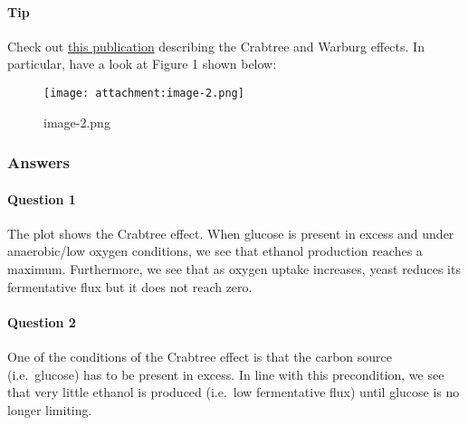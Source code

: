 \documentclass[11pt]{article}
\begin{document}
\hypertarget{tip}{%
\paragraph{Tip}\label{tip}}

Check out
\href{https://www.tandfonline.com/doi/full/10.1080/15384101.2018.1442622}{this
publication} describing the Crabtree and Warburg effects. In particular,
have a look at Figure 1 shown below:

\begin{figure}
\centering
\texttt{[image: attachment:image-2.png]}
\caption{image-2.png}
\end{figure}

\hypertarget{answers}{%
\subsubsection{Answers}\label{answers}}

\hypertarget{question-1}{%
\paragraph{Question 1}\label{question-1}}

The plot shows the Crabtree effect. When glucose is present in excess
and under anaerobic/low oxygen conditions, we see that ethanol
production reaches a maximum. Furthermore, we see that as oxygen uptake
increases, yeast reduces its fermentative flux but it does not reach
zero.

\hypertarget{question-2}{%
\paragraph{Question 2}\label{question-2}}

One of the conditions of the Crabtree effect is that the carbon source
(i.e.~glucose) has to be present in excess. In line with this
precondition, we see that very little ethanol is produced (i.e.~low
fermentative flux) until glucose is no longer limiting.
\end{document}
